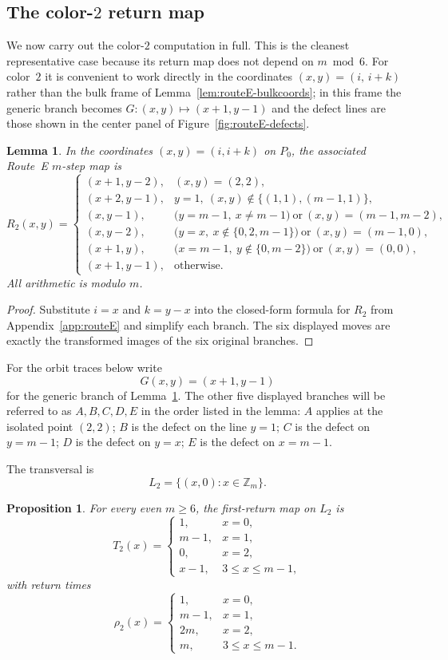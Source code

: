 \documentclass[11pt]{article}
\newtheorem{lemma}{Lemma}
\newtheorem{proposition}{Proposition}
\newcommand{\Zm}{\mathbb Z_m}
\begin{document}
\subsection{The color-$2$ return map}\label{sec:even-r2}
We now carry out the color-$2$ computation in full.
This is the cleanest representative case because its return map does not depend on $m\bmod 6$.
For color~$2$ it is convenient to work directly in the coordinates $(x,y)=(i,\,i+k)$ rather than the bulk frame of Lemma~\ref{lem:routeE-bulkcoords}; in this frame the generic branch becomes $G\colon(x,y)\mapsto(x+1,y-1)$ and the defect lines are those shown in the center panel of Figure~\ref{fig:routeE-defects}.

\begin{lemma}\label{lem:R2-main-xy}
In the coordinates $(x,y)=(i,i+k)$ on $P_0$, the associated Route~E $m$-step map is
\[
R_2(x,y)=
\begin{cases}
(x+1,y-2),&(x,y)=(2,2),\\
(x+2,y-1),&y=1,\ (x,y)\notin\{(1,1),(m-1,1)\},\\
(x,y-1),&\bigl(y=m-1,\ x\neq m-1\bigr)\ \text{or}\ (x,y)=(m-1,m-2),\\
(x,y-2),&\bigl(y=x,\ x\notin\{0,2,m-1\}\bigr)\ \text{or}\ (x,y)=(m-1,0),\\
(x+1,y),&\bigl(x=m-1,\ y\notin\{0,m-2\}\bigr)\ \text{or}\ (x,y)=(0,0),\\
(x+1,y-1),&\text{otherwise}.
\end{cases}
\]
All arithmetic is modulo $m$.
\end{lemma}

\begin{proof}
Substitute $i=x$ and $k=y-x$ into the closed-form formula for $R_2$ from Appendix~\ref{app:routeE} and simplify each branch.
The six displayed moves are exactly the transformed images of the six original branches.
\end{proof}

For the orbit traces below write
\[
G(x,y)=(x+1,y-1)
\]
for the generic branch of Lemma~\ref{lem:R2-main-xy}.
The other five displayed branches will be referred to as $A,B,C,D,E$ in the order listed in the lemma:
$A$ applies at the isolated point $(2,2)$;
$B$ is the defect on the line $y=1$;
$C$ is the defect on $y=m-1$;
$D$ is the defect on $y=x$;
$E$ is the defect on $x=m-1$.

The transversal is
\[
L_2=\{(x,0):x\in \Zm\}.
\]

\begin{proposition}\label{prop:R2-main-data}
For every even $m\ge 6$, the first-return map on $L_2$ is
\[
T_2(x)=
\begin{cases}
1,&x=0,\\
m-1,&x=1,\\
0,&x=2,\\
x-1,&3\le x\le m-1,
\end{cases}
\]
with return times
\[
\rho_2(x)=
\begin{cases}
1,&x=0,\\
m-1,&x=1,\\
2m,&x=2,\\
m,&3\le x\le m-1.
\end{cases}
\]
\end{proposition}
\end{document}

